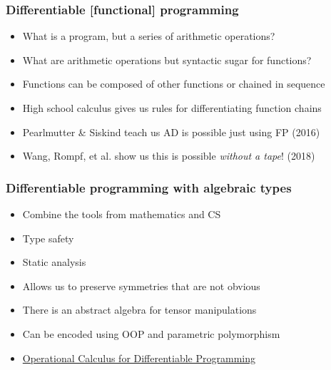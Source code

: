 \documentclass{beamer}
\begin{document}

    \begin{frame}
        \frametitle{Differentiable [functional] programming}
        \begin{itemize}
            \item What is a program, but a series of arithmetic operations?
            \item What are arithmetic operations but syntactic sugar for functions?
            \item Functions can be composed of other functions or chained in sequence
            \item High school calculus gives us rules for differentiating function chains
            \item Pearlmutter \& Siskind teach us AD is possible just using FP (2016)
            \item Wang, Rompf, et al. show us this is possible \textit{without a tape}! (2018)
        \end{itemize}
    \end{frame}


    \begin{frame}
        \frametitle{Differentiable programming with algebraic types}
        \begin{itemize}
            \item Combine the tools from mathematics and CS
            \item Type safety
            \item Static analysis
            \item Allows us to preserve symmetries that are not obvious
            \item There is an abstract algebra for tensor manipulations
            \item Can be encoded using OOP and parametric polymorphism
            \item \href{https://arxiv.org/pdf/1610.07690.pdf}{Operational Calculus for Differentiable Programming}
        \end{itemize}
    \end{frame}

\end{document}
